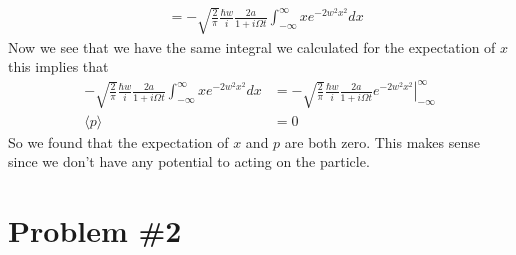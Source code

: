\documentclass[11pt]{article}
\numberwithin{equation}{section}
\newcommand{\expt}[1]{\langle{#1}\rangle}
\begin{document}
\begin{enumerate}[(a)]
\begin{align*}
&= -\sqrt{\frac{2}{\pi}}\frac{\hbar w}{i}\frac{2a}{1+i\Omega t}\int_{-\infty}^{\infty}xe^{-2w^2x^2}dx
\end{align*}
Now we see that we have the same integral we calculated for the expectation of $x$ this implies that
\begin{align*}
-\sqrt{\frac{2}{\pi}}\frac{\hbar w}{i}\frac{2a}{1+i\Omega t}\int_{-\infty}^{\infty}xe^{-2w^2x^2}dx &= -\sqrt{\frac{2}{\pi}}\frac{\hbar w}{i}\frac{2a}{1+i\Omega t}\left.e^{-2w^2x^2}\right|_{-\infty}^{\infty}\\
\expt{p} &= 0
\end{align*}
So we found that the expectation of $x$ and $p$ are both zero. This makes sense since we don't have any potential to acting on the particle.
\end{enumerate}

\section{Problem \#2}
\end{document}
